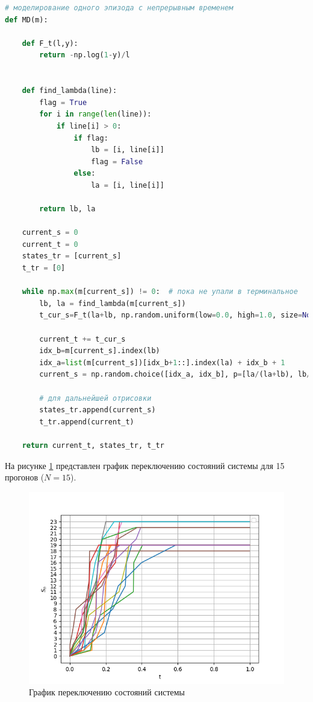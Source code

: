 \begin{lstlisting}[language=python, label=prog,caption={\textit{реализация марковского процесса}}]
# моделирование одного эпизода с непрерывным временем
def MD(m):

    def F_t(l,y):
        return -np.log(1-y)/l


    def find_lambda(line):
        flag = True
        for i in range(len(line)):
            if line[i] > 0:
                if flag:
                    lb = [i, line[i]]
                    flag = False
                else:
                    la = [i, line[i]]

        return lb, la

    current_s = 0
    current_t = 0
    states_tr = [current_s]
    t_tr = [0]

    while np.max(m[current_s]) != 0:  # пока не упали в терминальное
        lb, la = find_lambda(m[current_s])
        t_cur_s=F_t(la+lb, np.random.uniform(low=0.0, high=1.0, size=None))  # -log(1-y)/(lambda_a+lambda_b)

        current_t += t_cur_s
        idx_b=m[current_s].index(lb)
        idx_a=list(m[current_s])[idx_b+1::].index(la) + idx_b + 1
        current_s = np.random.choice([idx_a, idx_b], p=[la/(la+lb), lb/(la+lb)])

        # для дальнейшей отрисовки
        states_tr.append(current_s)
        t_tr.append(current_t)

    return current_t, states_tr, t_tr
\end{lstlisting}

На рисунке \ref{MDP} представлен график переключению состояний системы для 15 прогонов ($N=15$).
\begin{figure}[H]
\centerline{\includegraphics[scale = .8]{Images/term.png}}
\caption{График переключению состояний системы}
\label{MDP}
\end{figure}

